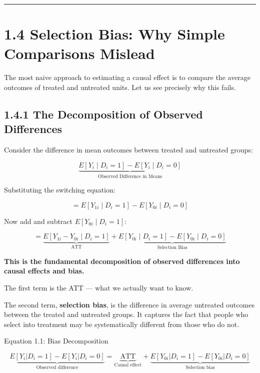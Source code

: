 \medskip\hrule\medskip

\section{1.4 Selection Bias: Why Simple Comparisons Mislead}

The most naive approach to estimating a causal effect is to compare the average outcomes of treated and untreated units. Let us see precisely why this fails.

\subsection{1.4.1 The Decomposition of Observed Differences}

Consider the difference in mean outcomes between treated and untreated groups:

\[
\underbrace{E[Y_i \mid D_i = 1] - E[Y_i \mid D_i = 0]}_{\text{Observed Difference in Means}}
\]

Substituting the switching equation:

\[
= E[Y_{1i} \mid D_i = 1] - E[Y_{0i} \mid D_i = 0]
\]

Now add and subtract $E[Y_{0i} \mid D_i = 1]$:

\[
= \underbrace{E[Y_{1i} - Y_{0i} \mid D_i = 1]}_{\text{ATT}} + \underbrace{E[Y_{0i} \mid D_i = 1] - E[Y_{0i} \mid D_i = 0]}_{\text{Selection Bias}}
\]

\textbf{This is the fundamental decomposition of observed differences into causal effects and bias.}

The first term is the ATT --- what we actually want to know.

The second term, \textbf{selection bias}, is the difference in average untreated outcomes between the treated and untreated groups. It captures the fact that people who select into treatment may be systematically different from those who do not.

\begin{keybox}{Equation 1.1: Bias Decomposition}
\end{keybox}
\[
\underbrace{E[Y_i|D_i=1] - E[Y_i|D_i=0]}_{\text{Observed difference}} = \underbrace{\text{ATT}}_{\text{Causal effect}} + \underbrace{E[Y_{0i}|D_i=1] - E[Y_{0i}|D_i=0]}_{\text{Selection bias}}
\]

